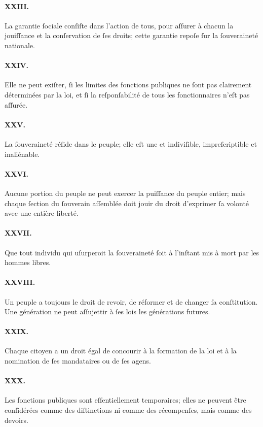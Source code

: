 \documentclass[10pt]{lecturenotes}
\begin{document}
\paragraph*{XXIII.}La garantie ſociale conſiſte dans l'action de tous, pour aſſurer à chacun la jouiſſance et la conſervation de ſes droits; cette garantie repoſe ſur la ſouveraineté nationale.
\paragraph*{XXIV.}Elle ne peut exiſter, ſi les limites des fonctions publiques ne ſont pas clairement déterminées par la loi, et ſi la reſponſabilité de tous les fonctionnaires n'eſt pas aſſurée.
\paragraph*{XXV.}La ſouveraineté réſide dans le peuple; elle eſt une et indiviſible, impreſcriptible et inaliénable.
\paragraph*{XXVI.}Aucune portion du peuple ne peut exercer la puiſſance du peuple entier; mais chaque ſection du ſouverain aſſemblée doit jouir du droit d'exprimer ſa volonté avec une entière liberté.
\paragraph*{XXVII.}Que tout individu qui uſurperoit la ſouveraineté ſoit à l'inſtant mis à mort par les hommes libres.
\paragraph*{XXVIII.}Un peuple a toujours le droit de revoir, de réformer et de changer ſa conſtitution. Une génération ne peut aſſujettir à ſes lois les générations futures.
\paragraph*{XXIX.}Chaque citoyen a un droit égal de concourir à la formation de la loi et à la nomination de ſes mandataires ou de ſes agens.
\paragraph*{XXX.}Les fonctions publiques sont eſſentiellement temporaires; elles ne peuvent être conſidérées comme des diſtinctions ni comme des récompenſes, mais comme des devoirs.
\end{document}

